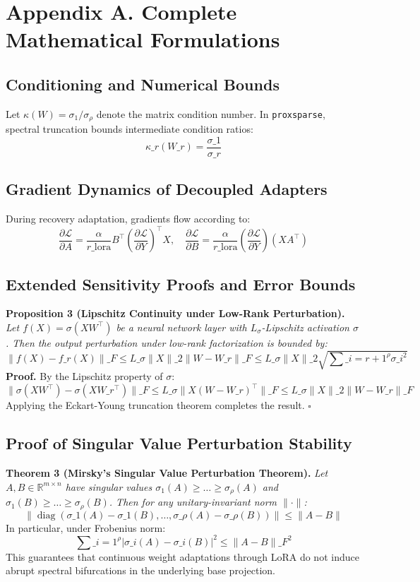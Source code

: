 \section*{Appendix A. Complete Mathematical Formulations}

\subsection*{Conditioning and Numerical Bounds}
Let $\kappa(W) = \sigma_1 / \sigma_\rho$ denote the matrix condition number. In \texttt{proxsparse}, spectral truncation bounds intermediate condition ratios:
\[
\kappa\_r(W\_r) = \frac{\sigma\_1}{\sigma\_r}
\]

\subsection*{Gradient Dynamics of Decoupled Adapters}
During recovery adaptation, gradients flow according to:
\[
\frac{\partial \mathcal{L}}{\partial A} = \frac{\alpha}{r\_{\text{lora}}} B^\top \left( \frac{\partial \mathcal{L}}{\partial Y} \right)^\top X, \quad \frac{\partial \mathcal{L}}{\partial B} = \frac{\alpha}{r\_{\text{lora}}} \left( \frac{\partial \mathcal{L}}{\partial Y} \right) (X A^\top)
\]

\subsection*{Extended Sensitivity Proofs and Error Bounds}
\textbf{Proposition 3 (Lipschitz Continuity under Low-Rank Perturbation).} \textit{Let $f(X) = \sigma(X W^\top)$ be a neural network layer with $L_\sigma$-Lipschitz activation $\sigma$. Then the output perturbation under low-rank factorization is bounded by:}
\[
\|f(X) - f\_r(X)\|\_F \le L\_\sigma \|X\|\_2 \|W - W\_r\|\_F \le L\_\sigma \|X\|\_2 \sqrt{\sum\_{i=r+1}^\rho \sigma\_i^2}
\]
\textbf{Proof.} By the Lipschitz property of $\sigma$:
\[
\|\sigma(X W^\top) - \sigma(X W\_r^\top)\|\_F \le L\_\sigma \|X (W - W\_r)^\top\|\_F \le L\_\sigma \|X\|\_2 \|W - W\_r\|\_F
\]
Applying the Eckart-Young truncation theorem completes the result. $\square$

\subsection*{Proof of Singular Value Perturbation Stability}
\textbf{Theorem 3 (Mirsky's Singular Value Perturbation Theorem).} \textit{Let $A, B \in \mathbb{R}^{m \times n}$ have singular values $\sigma_1(A) \ge \dots \ge \sigma_\rho(A)$ and $\sigma_1(B) \ge \dots \ge \sigma_\rho(B)$. Then for any unitary-invariant norm $\|\cdot\|$:}
\[
\left\| \operatorname{diag}(\sigma\_1(A) - \sigma\_1(B), \dots, \sigma\_\rho(A) - \sigma\_\rho(B)) \right\| \le \|A - B\|
\]
In particular, under Frobenius norm:
\[
\sum\_{i=1}^\rho |\sigma\_i(A) - \sigma\_i(B)|^2 \le \|A - B\|\_F^2
\]
This guarantees that continuous weight adaptations through LoRA do not induce abrupt spectral bifurcations in the underlying base projection.

